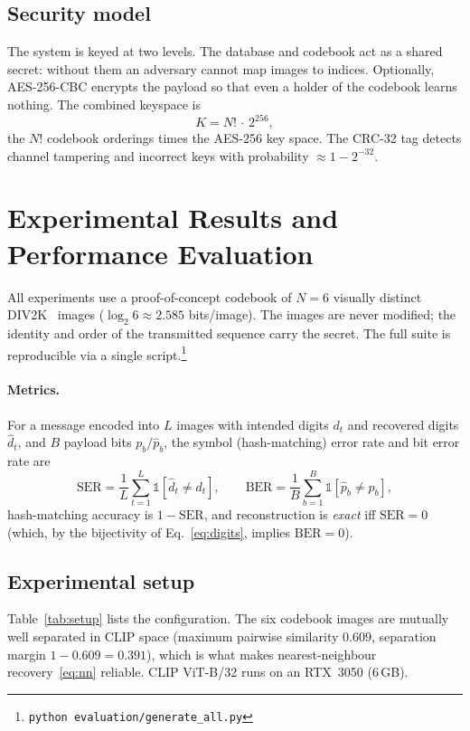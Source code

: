 \documentclass[10pt]{article}
\begin{document}
\subsection{Security model}
The system is keyed at two levels. The database and codebook act as a shared
secret: without them an adversary cannot map images to indices. Optionally,
AES-256-CBC encrypts the payload so that even a holder of the codebook learns
nothing. The combined keyspace is
\begin{equation}
  K = N!\,\cdot\,2^{256},
  \label{eq:keyspace}
\end{equation}
the $N!$ codebook orderings times the AES-256 key space. The CRC-32 tag detects
channel tampering and incorrect keys with probability $\approx 1-2^{-32}$.

\section{Experimental Results and Performance Evaluation}\label{sec:results}
All experiments use a proof-of-concept codebook of $N{=}6$ visually distinct
DIV2K~\cite{div2k2017} images ($\log_2 6\approx2.585$ bits/image). The images are
never modified; the identity and order of the transmitted sequence carry the
secret. The full suite is reproducible via a single
script.\footnote{\texttt{python evaluation/generate\_all.py}}

\paragraph{Metrics.} For a message encoded into $L$ images with intended digits
$d_t$ and recovered digits $\hat d_t$, and $B$ payload bits $p_b/\hat p_b$, the
symbol (hash-matching) error rate and bit error rate are
\begin{equation}
  \mathrm{SER}=\frac{1}{L}\sum_{t=1}^{L}\mathbb{1}\!\left[\hat d_t\neq d_t\right],
  \qquad
  \mathrm{BER}=\frac{1}{B}\sum_{b=1}^{B}\mathbb{1}\!\left[\hat p_b\neq p_b\right],
  \label{eq:ber}
\end{equation}
hash-matching accuracy is $1-\mathrm{SER}$, and reconstruction is \emph{exact}
iff $\mathrm{SER}=0$ (which, by the bijectivity of Eq.~\eqref{eq:digits}, implies
$\mathrm{BER}=0$).

\subsection{Experimental setup}
Table~\ref{tab:setup} lists the configuration. The six codebook images are
mutually well separated in CLIP space (maximum pairwise similarity $0.609$,
separation margin $1-0.609=0.391$), which is what makes nearest-neighbour
recovery~\eqref{eq:nn} reliable. CLIP ViT-B/32 runs on an RTX~3050 (6\,GB).
\end{document}
